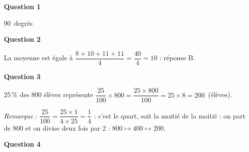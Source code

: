 %

\medskip

\textbf{Question 1}

90~degrés

\medskip

\textbf{Question 2}


%
La moyenne est égale à $\dfrac{8 + 10 + 11 + 11}{4} = \dfrac{40}{4} = 10$ : réponse B.
\medskip

\textbf{Question 3}

%

25\,\% des 800 élèves représente $\dfrac{25}{100} \times 800 = \dfrac{25 \times 800}{100} = 25 \times 8 = 200$~(élèves).

\emph{Remarque } : $\dfrac{25}{100} = \dfrac{25 \times 1}{4 \times 25} = \dfrac14$ : c'est le quart, soit la moitié de la moitié : on part de 800 et on divise deux fois par 2 : $800 \longmapsto 400 \longmapsto 200$.

\medskip

\textbf{Question 4}

%

